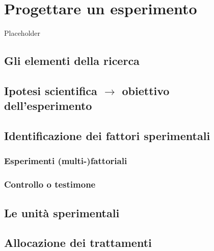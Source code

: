 \documentclass[a4paper,12pt,oneside]{book}
\begin{document}
\hypertarget{progettare-un-esperimento}{%
\chapter{Progettare un esperimento}\label{progettare-un-esperimento}}

Placeholder

\hypertarget{gli-elementi-della-ricerca}{%
\section{Gli elementi della ricerca}\label{gli-elementi-della-ricerca}}

\hypertarget{ipotesi-scientifica-rightarrow-obiettivo-dellesperimento}{%
\section{\texorpdfstring{Ipotesi scientifica \(\rightarrow\) obiettivo dell'esperimento}{Ipotesi scientifica \textbackslash rightarrow obiettivo dell'esperimento}}\label{ipotesi-scientifica-rightarrow-obiettivo-dellesperimento}}

\hypertarget{identificazione-dei-fattori-sperimentali}{%
\section{Identificazione dei fattori sperimentali}\label{identificazione-dei-fattori-sperimentali}}

\hypertarget{esperimenti-multi-fattoriali}{%
\subsection{Esperimenti (multi-)fattoriali}\label{esperimenti-multi-fattoriali}}

\hypertarget{controllo-o-testimone}{%
\subsection{Controllo o testimone}\label{controllo-o-testimone}}

\hypertarget{le-unituxe0-sperimentali}{%
\section{Le unità sperimentali}\label{le-unituxe0-sperimentali}}

\hypertarget{allocazione-dei-trattamenti}{%
\section{Allocazione dei trattamenti}\label{allocazione-dei-trattamenti}}
\end{document}
